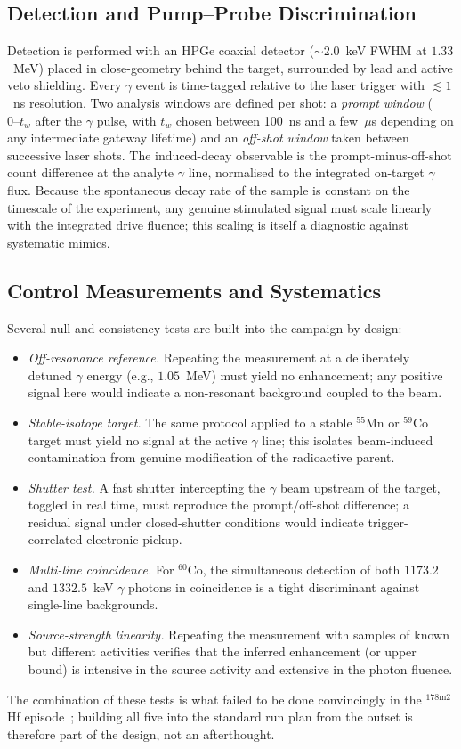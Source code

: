 \documentclass[conference]{IEEEtran}
\begin{document}
\subsection{Detection and Pump--Probe Discrimination}
Detection is performed with an HPGe coaxial detector ($\sim 2.0$~keV FWHM at $1.33$~MeV) placed in close-geometry behind the target, surrounded by lead and active veto shielding. Every $\gamma$ event is time-tagged relative to the laser trigger with $\lesssim 1$~ns resolution. Two analysis windows are defined per shot: a \emph{prompt window} ($0\text{--}t_w$ after the $\gamma$ pulse, with $t_w$ chosen between 100~ns and a few~$\mu$s depending on any intermediate gateway lifetime) and an \emph{off-shot window} taken between successive laser shots. The induced-decay observable is the prompt-minus-off-shot count difference at the analyte $\gamma$ line, normalised to the integrated on-target $\gamma$ flux. Because the spontaneous decay rate of the sample is constant on the timescale of the experiment, any genuine stimulated signal must scale linearly with the integrated drive fluence; this scaling is itself a diagnostic against systematic mimics.

\subsection{Control Measurements and Systematics}
Several null and consistency tests are built into the campaign by design:
\begin{itemize}
\item \emph{Off-resonance reference.} Repeating the measurement at a deliberately detuned $\gamma$ energy (e.g., $1.05$~MeV) must yield no enhancement; any positive signal here would indicate a non-resonant background coupled to the beam.
\item \emph{Stable-isotope target.} The same protocol applied to a stable $^{55}$Mn or $^{59}$Co target must yield no signal at the active $\gamma$ line; this isolates beam-induced contamination from genuine modification of the radioactive parent.
\item \emph{Shutter test.} A fast shutter intercepting the $\gamma$ beam upstream of the target, toggled in real time, must reproduce the prompt/off-shot difference; a residual signal under closed-shutter conditions would indicate trigger-correlated electronic pickup.
\item \emph{Multi-line coincidence.} For $^{60}$Co, the simultaneous detection of both $1173.2$ and $1332.5$~keV $\gamma$ photons in coincidence is a tight discriminant against single-line backgrounds.
\item \emph{Source-strength linearity.} Repeating the measurement with samples of known but different activities verifies that the inferred enhancement (or upper bound) is intensive in the source activity and extensive in the photon fluence.
\end{itemize}
The combination of these tests is what failed to be done convincingly in the $^{178\mathrm{m}2}$Hf episode~\cite{collins1999hafnium,ahmad2003hafnium}; building all five into the standard run plan from the outset is therefore part of the design, not an afterthought.
\end{document}
